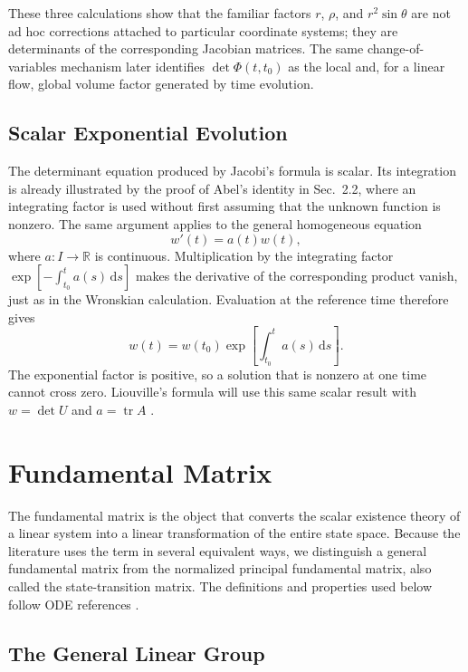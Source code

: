 \documentclass[11pt,a4paper]{article}
\newcommand{\be}{\begin{equation}}
\newcommand{\ee}{\end{equation}}
\newcommand{\lb}[1]{\label{#1}}
\newcommand{\dd}{\mathrm{d}}
\newcommand{\R}{\mathbb{R}}
\DeclareMathOperator{\tr}{tr}
\theoremstyle{definition}
\numberwithin{equation}{section}
\begin{document}
These three calculations show that the familiar factors $r$, $\rho$, and $r^2\sin\theta$ are not ad hoc corrections attached to particular coordinate systems; they are determinants of the corresponding Jacobian matrices. The same change-of-variables mechanism later identifies $\det\Phi(t,t_0)$ as the local and, for a linear flow, global volume factor generated by time evolution.

\subsection{Scalar Exponential Evolution}

The determinant equation produced by Jacobi's formula is scalar. Its integration is already illustrated by the proof of Abel's identity in Sec.~2.2, where an integrating factor is used without first assuming that the unknown function is nonzero. The same argument applies to the general homogeneous equation
\be
w'(t)=a(t)w(t),
\lb{eq:scalar-ode}
\ee
where $a:I\to\R$ is continuous. Multiplication by the integrating factor $\exp[-\int_{t_0}^{t}a(s)\,\dd s]$ makes the derivative of the corresponding product vanish, just as in the Wronskian calculation. Evaluation at the reference time therefore gives
\be
w(t)=w(t_0)
\exp\left[
\int_{t_0}^{t}a(s)\,\dd s
\right].
\lb{eq:scalar-solution}
\ee
The exponential factor is positive, so a solution that is nonzero at one time cannot cross zero. Liouville's formula will use this same scalar result with $w=\det U$ and $a=\tr A$ \cite{coddington1955,teschl2012}.


\section{Fundamental Matrix}

The fundamental matrix is the object that converts the scalar existence theory of a linear system into a linear transformation of the entire state space. Because the literature uses the term in several equivalent ways, we distinguish a general fundamental matrix from the normalized principal fundamental matrix, also called the state-transition matrix. The definitions and properties used below follow ODE references \cite{coddington1955,hartman2002,teschl2012}.

\subsection{The General Linear Group}
\end{document}
